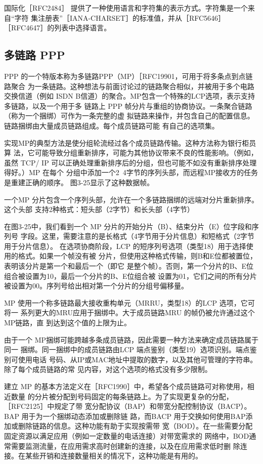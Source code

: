 国际化［RFC2484］ 提供了一种使用语言和字符集的表示方式。字符集是一个来自“字符
集注册表”［IANA-CHARSET］的标准值，并从［RFC5646］ ［RFC4647］的列表中选择语言。

\subsection{多链路 PPP}

PPP 的一个特版本称为多链路PPP（MP）［RFC19901，可用于将多条点到点链路聚合
为一条链路。这种想法与前面讨论过的链路聚合相似，并被用于多个电路交换信道（例如
ISDN B信道）的聚合。MP包含一个特殊的LCP选项，表示支持多链路，以及一个用于多
链路上 PPP 帧分片与重组的协商协议。一条聚合链路（称为一个捆绑）可作为一条完整的虚
拟链路来操作，并包含自己的配置信息。链路捆绑由大量成员链路组成。每个成员链路可能
有自己的选项集。

实现MP的典型方法是使分组轮流经过各个成员链路传输。这种方法称为银行柜员算
法，它可能导致分组重新排序，可能为其他协议带来不良的性能影响。（例如，虽然 TCP/
IP 可以正确处理重新排序后的分组，但也可能不如没有重新排序处理得好。）MP 在每个
分组中添加一个2~4字节的序列头部，而远程MP接收方的任务是重建正确的顺序。
图3-25显示了这种数据帧。


一个MP 分片包含一个序列头部，允许在一个多链路捆绑的远端对分片重新排序。这个头部
支持2种格式：短头部（2字节）和长头部（4字节）

在图3-25中，我们看到一个 MP 分片的开始分片（B）、结束分片（E）位字段和序列号
字段。这里，需要注意的是长格式（4字节用于分片信息）和短格式（2字节用于分片信息）。
在选项协商阶段，LCP 的短序列号选项（类型18）用于选择使用的格式。如果一个帧没有被
分片，但使用这种格式传输，则B和E位都被置位，表明该分片是第一个和最后一个（即它
是整个帧）。否则，第一个分片的B、E位组合被设置为10，最后一个分片的B、E位组合被
设置为01，它们之间的所有分片被设置为00。序列号给出相对第一个分片的分组号偏移量。

MP 使用一个称多链路最大接收重构单元（MRRU，类型18）的LCP 选项，它可将一
系列更大的MRU应用于捆绑中。大于成员链路MRU 的帧仍被允许通过这个MP链路，直
到达到这个值的上限为止。

由于一个 MP捆绑可能跨越多条成员链路，因此需要一种方法来确定成员链路属于同一
捆绑。同一捆绑中的成员链路由LCP 端点鉴别（类型19）选项识别。端点鉴别可使用电话
号码、从IP或MAC地址中提取的数字，以及其他可管理的字符串。除了每个成员链路的常
见内容，对这个选项的格式没有多少限制。

建立 MP 的基本方法定义在［RFC1990］中，希望各个成员链路可对称使用，相近数量
的分片被分配到号码固定的每条链路上。为了实现更复杂的分配，［RFC2125］中规定了带
宽分配协议（BAP）和带宽分配控制协议（BACP）。BAP 用于为一个捆绑动态添加或删除链
路，而BACP 用于交换如何使用BAP添加或删除链路的信息。这种功能有助于实现按需带
宽（BOD）。在一些需要分配固定资源以满足应用（例如一定数量的电话连接）对带宽需求的
网络中，BOD通常需要监测流量，在应用需求高时创建新的连接，以及在应用需求低时删
除连接。在某些开销和连接数量相关的情况下，这种功能是有用的。

